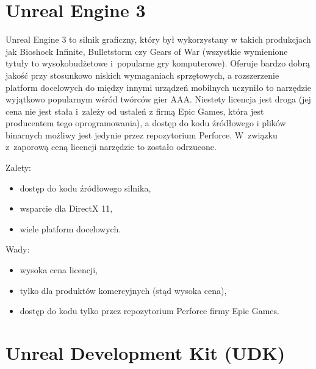 \section{Unreal Engine 3}

Unreal Engine 3 to silnik graficzny, który był wykorzystany w takich produkcjach jak Bioshock Infinite, Bulletstorm czy Gears of War (wszystkie wymienione tytuły to wysokobudżetowe i~popularne gry komputerowe). Oferuje bardzo dobrą jakość przy stosunkowo niskich wymaganiach sprzętowych, a rozszerzenie platform docelowych do między innymi urządzeń mobilnych uczyniło to narzędzie wyjątkowo popularnym wśród twórców gier AAA. Niestety licencja jest droga (jej cena nie jest stała i~zależy od ustaleń z firmą Epic Games, która jest producentem tego oprogramowania), a dostęp do kodu źródłowego i plików binarnych możliwy jest jedynie przez repozytorium Perforce. W~związku z~zaporową ceną licencji narzędzie to zostało odrzucone.\\

{\raggedright Zalety:
\begin{itemize}
\item dostęp do kodu źródłowego silnika,
\item wsparcie dla DirectX 11,
\item wiele platform docelowych.
\end{itemize}

Wady:
\begin{itemize}
\item wysoka cena licencji,
\item tylko dla produktów komercyjnych (stąd wysoka cena),
\item dostęp do kodu tylko przez repozytorium Perforce firmy Epic Games.
\end{itemize}
}

\section{Unreal Development Kit (UDK)}

